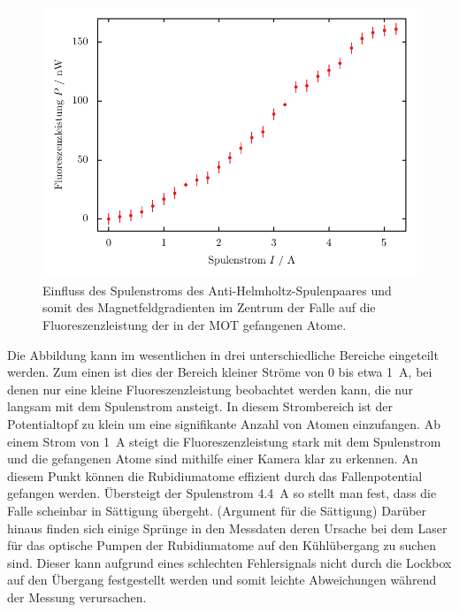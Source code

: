\documentclass[11pt, a4paper]{article}
\numberwithin{equation}{section}
\newcommand{\korr}[1]{{\color{red}(#1)}}
\begin{document}
\begin{figure}[hp]
	\centering
	\includegraphics{./figures/magnetic_field.pdf}
	\caption{Einfluss des Spulenstroms des Anti-Helmholtz-Spulenpaares und somit des Magnetfeldgradienten im Zentrum der Falle auf die Fluoreszenzleistung der in der MOT gefangenen Atome.}
	\label{fig:magnetic_field}
	\vspace{1cm}
	\begin{minipage}[t]{0.3\textwidth}
		\centering
		\vspace*{-\dimexpr\baselineskip+\heavyrulewidth+\abovetopsep\relax}
		
	\end{minipage} 
	\begin{minipage}[t]{0.3\textwidth}
		\centering
		\vspace*{-\dimexpr\baselineskip+\heavyrulewidth+\abovetopsep\relax}
		
	\end{minipage}
	\label{tab:magnetic_field}
\end{figure}

Die Abbildung kann im wesentlichen in drei unterschiedliche Bereiche eingeteilt werden.
Zum einen ist dies der Bereich kleiner Ströme von \num{0} bis etwa \SI{1}{\ampere}, bei denen nur eine kleine Fluoreszenzleistung beobachtet werden kann, die nur langsam mit dem Spulenstrom ansteigt.
In diesem Strombereich ist der Potentialtopf zu klein um eine signifikante Anzahl von Atomen einzufangen.
Ab einem Strom von \SI{1}{\ampere} steigt die Fluoreszenzleistung stark mit dem Spulenstrom und die gefangenen Atome sind mithilfe einer Kamera klar zu erkennen.
An diesem Punkt können die Rubidiumatome effizient durch das Fallenpotential gefangen werden.
Übersteigt der Spulenstrom \SI{4.4}{\ampere} so stellt man fest, dass die Falle scheinbar in Sättigung übergeht.
\korr{Argument für die Sättigung}
Darüber hinaus finden sich einige Sprünge in den Messdaten deren Ursache bei dem Laser für das optische Pumpen der Rubidiumatome auf den Kühlübergang zu suchen sind.
Dieser kann aufgrund eines schlechten Fehlersignals nicht durch die Lockbox auf den Übergang festgestellt werden und somit leichte Abweichungen während der Messung verursachen.
\end{document}
